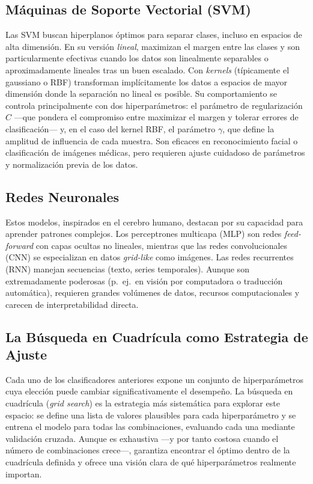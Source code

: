 \subsection{Máquinas de Soporte Vectorial (SVM)}

Las SVM buscan hiperplanos óptimos para separar clases, incluso en espacios
de alta dimensión. En su versión \textit{lineal}, maximizan el margen entre
las clases y son particularmente efectivas cuando los datos son linealmente
separables o aproximadamente lineales tras un buen escalado. Con
\textit{kernels} (típicamente el gaussiano o RBF) transforman implícitamente
los datos a espacios de mayor dimensión donde la separación no lineal es
posible. Su comportamiento se controla principalmente con dos hiperparámetros:
el parámetro de regularización $C$ ---que pondera el compromiso entre
maximizar el margen y tolerar errores de clasificación--- y, en el caso del
kernel RBF, el parámetro $\gamma$, que define la amplitud de influencia de
cada muestra. Son eficaces en reconocimiento facial o clasificación de
imágenes médicas, pero requieren ajuste cuidadoso de parámetros y
normalización previa de los datos.

\subsection{Redes Neuronales}

Estos modelos, inspirados en el cerebro humano, destacan por su capacidad
para aprender patrones complejos. Los perceptrones multicapa (MLP) son redes
\textit{feed-forward} con capas ocultas no lineales, mientras que las redes
convolucionales (CNN) se especializan en datos \textit{grid-like} como
imágenes. Las redes recurrentes (RNN) manejan secuencias (texto, series
temporales). Aunque son extremadamente poderosas (p.~ej.\ en visión por
computadora o traducción automática), requieren grandes volúmenes de datos,
recursos computacionales y carecen de interpretabilidad directa.

\subsection{La Búsqueda en Cuadrícula como Estrategia de Ajuste}

Cada uno de los clasificadores anteriores expone un conjunto de
hiperparámetros cuya elección puede cambiar significativamente el desempeño.
La búsqueda en cuadrícula (\textit{grid search}) es la estrategia más
sistemática para explorar este espacio: se define una lista de valores
plausibles para cada hiperparámetro y se entrena el modelo para todas las
combinaciones, evaluando cada una mediante validación cruzada. Aunque es
exhaustiva ---y por tanto costosa cuando el número de combinaciones
crece---, garantiza encontrar el óptimo dentro de la cuadrícula definida y
ofrece una visión clara de qué hiperparámetros realmente importan.

